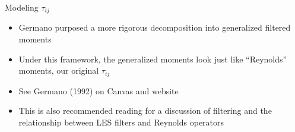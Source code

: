 \begin{frame}{Modeling $\tau_{ij}$}
\begin{itemize}
\item Germano purposed a more rigorous decomposition into generalized filtered moments
\item Under this framework, the generalized moments look just like ``Reynolds'' moments, our original $\tau_{ij}$
\item See Germano (1992) on Canvas and website
\item This is also recommended reading for a discussion of filtering and the relationship between LES filters and Reynolds operators
\end{itemize}
\end{frame}




